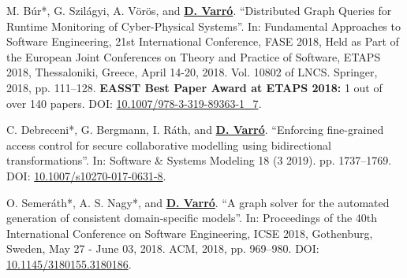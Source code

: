 {\small
\begin{yearlist}
\item[\cite{fase2018-cps}] 
M. Búr*, G. Szilágyi, A. Vörös, and \underline{\textbf{D. Varró}}. “Distributed Graph Queries for Runtime Monitoring of Cyber-Physical Systems”. In: Fundamental Approaches to Software Engineering, 21st International Conference, FASE 2018, Held as Part of the European Joint Conferences on Theory and Practice of Software, ETAPS 2018, Thessaloniki, Greece, April 14-20, 2018. Vol. 10802 of LNCS.  Springer, 2018, pp. 111–128. 
\newline \textbf{EASST Best Paper Award at ETAPS 2018:} 1 out of over 140 papers.
\newline DOI: \href{https://doi.org/10.1007/978-3-319-89363-1_7}{10.1007/978-3-319-89363-1\_7}.



\item[\cite{sosym2017-mondo}]
C. Debreceni*, G. Bergmann, I. Ráth, and \underline{\textbf{D. Varró}}. “Enforcing fine-grained access control for secure collaborative modelling using bidirectional transformations”. In: Software \& Systems Modeling 18 (3 2019). pp. 1737–1769. 
\newline DOI: \href{https://doi.org/10.1007/s10270-017-0631-8}{10.1007/s10270-017-0631-8}.

\item[\cite{icse2018-solver}] 
O. Semeráth*, A. S. Nagy*, and \underline{\textbf{D. Varró}}. “A graph solver for the automated generation of consistent domain-specific models”. In: Proceedings of the 40th International Conference on Software Engineering, ICSE 2018, Gothenburg, Sweden, May 27 - June 03, 2018. ACM, 2018, pp. 969–980. 
\newline DOI: \href{https://doi.org/10.1145/3180155.3180186}{10.1145/3180155.3180186}.



\end{yearlist}}
